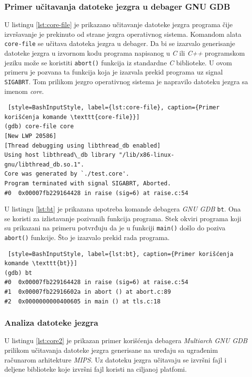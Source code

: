 \documentclass[12pt,oneside]{memoir}
\begin{document}
\subsubsection{Primer učitavanja datoteke jezgra u debager GNU GDB}

U listingu \ref{lst:core-file} je prikazano učitavanje datoteke jezgra programa čije izvršavanje je prekinuto od strane jezgra operativnog sistema. Komandom alata \texttt{core-file} se učitava datoteka jezgra u debager. Da bi se izazvalo generisanje datoteke jezgra u izvornom kodu programa napisanog u \emph{C} ili \emph{C++} programskom jeziku može se koristiti \texttt{abort()} funkcija iz standardne \emph{C} biblioteke. U ovom primeru je pozvana ta funkcija koja je izazvala prekid programa uz signal \texttt{SIGABRT}. Tom prilikom jezgro operativnog sistema je napravilo datoteku jezgra sa imenom \emph{core}.
\begin{lstlisting} [style=BashInputStyle, label={lst:core-file}, caption={Primer korišćenja komande \texttt{core-file}}]
(gdb) core-file core
[New LWP 20586]
[Thread debugging using libthread_db enabled]
Using host libthread\_db library "/lib/x86-linux-gnu/libthread_db.so.1".
Core was generated by `./test.core'.
Program terminated with signal SIGABRT, Aborted.
#0  0x00007fb229164428 in raise (sig=6) at raise.c:54
\end{lstlisting}


U listingu \ref{lst:bt} je prikazana upotreba komande debagera \emph{GNU GDB} \texttt{bt}. Ona se koristi za izlistavanje pozivanih funkcija programa. Stek okviri programa koji su prikazani na primeru potvrđuju da je u funkciji \texttt{main()} došlo do poziva \texttt{abort()} funkcije. Što je izazvalo prekid rada programa.

\begin{lstlisting} [style=BashInputStyle, label={lst:bt}, caption={Primer korišćenja komande \texttt{bt}}]
(gdb) bt
#0  0x00007fb229164428 in raise (sig=6) at raise.c:54
#1  0x00007fb22916602a in abort () at abort.c:89
#2  0x0000000000400605 in main () at tls.c:18
\end{lstlisting}

\subsubsection{Analiza datoteke jezgra}

U listingu \ref{lst:core2} je prikazan primer korišćenja debagera \emph{Multiarch GNU GDB} prilikom učitavanja datoteke jezgra generisane na uređaju sa ugrađenim računarom arhitekture \emph{MIPS}. Uz datoteku jezgra učitavaju se izvršni fajl i deljene biblioteke koje izvršni fajl koristi na ciljanoj platfomi.\newpage
\end{document}
